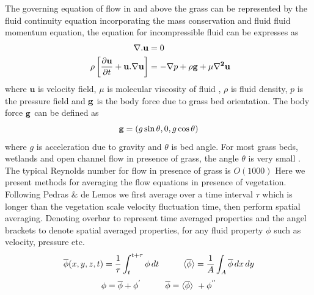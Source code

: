 \documentclass[12pt]{report}   %
\newcommand{\bu}{\mathbf{u}}
\newcommand{\grad}{\mathbf{\nabla}}
\renewcommand{\bar}{\overline}
\begin{document}
The governing equation of flow in and above the grass can be represented by the fluid continuity equation incorporating the mass conservation and fluid fluid momentum equation, the equation for incompressible fluid can be expresses as
\begin{equation}\
\begin{split}
  \grad .{\bu}&=0 \\
 \rho \left[ \frac{\partial {\bu}  }{\partial t}+  {\bu} . \grad \bu  \right ] &= - \grad{p} +\rho \bf{g}  +\mu \grad^2\bu
\end{split}
\label{NavierStokes}
\end{equation}
where $\bu$ is velocity field, $\mu$ is molecular viscosity of fluid , $\rho$ is fluid density, $p$ is the pressure field and $\bf{g}$ is the body force due to grass bed orientation. The body force $\bf{g}$ can be defined as 
\[{\bf{g}} = \left(g \sin{\theta},0, g \cos{\theta} \right) \]
where $g$ is acceleration due to gravity and $\theta$ is bed angle. For most grass beds, wetlands and open channel flow in presence of grass, the angle $\theta$ is very small \cite{Garcia1996}.
The typical Reynolds number for flow in presence of grass is $O(1000)$
Here we present methods for averaging the flow equations in presence of vegetation. Following Pedras $\&$ de Lemos \cite{Pedras00} we first average over a time interval $\tau$ which is longer than the vegetation scale velocity fluctuation time, then perform spatial averaging. Denoting 
overbar to represent time averaged properties and the angel brackets to denote spatial averaged properties, for any fluid property $\phi$ such as velocity, pressure etc.
  \[ \bar{\phi}(x,y,z,t) = \frac{1}{\tau} \int_{t}^{t+\tau} \phi  \, dt \hspace{1.cm}  \langle \bar{\phi}\rangle = \frac{1}{A} \int_{A} \bar{\phi}  \,dx \,dy \]
  \[\phi = \bar{\phi}+\phi^{'} \hspace{1.cm}  \bar{\phi} = \langle \bar{\phi} \rangle \ +\phi^{''} \]
\end{document}
